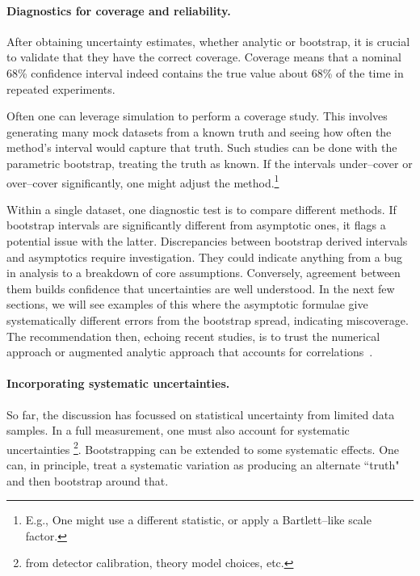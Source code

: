         \paragraph{Diagnostics for coverage and reliability.}
            After obtaining uncertainty estimates, whether analytic or bootstrap, it is crucial to validate that they have the correct coverage.
            Coverage means that a nominal 68\% confidence interval indeed contains the true value about 68\% of the time in repeated experiments.
            
            Often one can leverage simulation to perform a coverage study.
            This involves generating many mock datasets from a known truth and seeing how often the method's interval would capture that truth.
            Such studies can be done with the parametric bootstrap, treating the truth as known.
            If the intervals under--cover or over--cover significantly, one might adjust the method.\footnote{E.g., One might use a different statistic, or apply a Bartlett--like scale factor.}
            
            Within a single dataset, one diagnostic test is to compare different methods.
            If bootstrap intervals are significantly different from asymptotic ones, it flags a potential issue with the latter.
            Discrepancies between bootstrap derived intervals and asymptotics require investigation.
            They could indicate anything from a bug in analysis to a breakdown of core assumptions.
            Conversely, agreement between them builds confidence that uncertainties are well understood.
            In the next few sections, we will see examples of this where the asymptotic formulae give systematically different errors from the bootstrap spread, indicating miscoverage.
            The recommendation then, echoing recent studies, is to trust the numerical approach or augmented analytic approach that accounts for correlations~\cite{VanDenBroeck2006BinarySearches}.
            
        \paragraph{Incorporating systematic uncertainties.}
            So far, the discussion has focussed on statistical uncertainty from limited data samples.
            In a full measurement, one must also account for systematic uncertainties \footnote{from detector calibration, theory model choices, etc.}.
            Bootstrapping can be extended to some systematic effects.
            One can, in principle, treat a systematic variation as producing an alternate ``truth" and then bootstrap around that.
            

